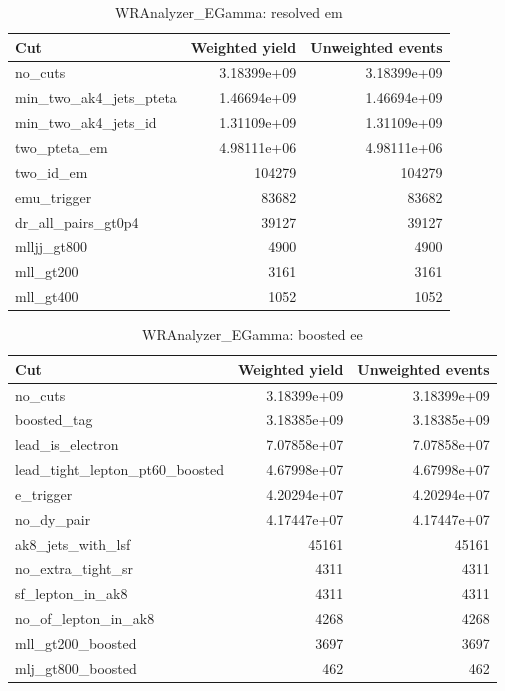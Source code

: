\documentclass{article}
\begin{document}
\begin{table}[htbp]
\centering
\caption{WRAnalyzer\_EGamma: resolved em}
\begin{tabular}{lrr}
\hline
Cut & Weighted yield & Unweighted events \\
\hline
no\_cuts & 3.18399e+09 & 3.18399e+09 \\
min\_two\_ak4\_jets\_pteta & 1.46694e+09 & 1.46694e+09 \\
min\_two\_ak4\_jets\_id & 1.31109e+09 & 1.31109e+09 \\
two\_pteta\_em & 4.98111e+06 & 4.98111e+06 \\
two\_id\_em & 104279 & 104279 \\
emu\_trigger & 83682 & 83682 \\
dr\_all\_pairs\_gt0p4 & 39127 & 39127 \\
mlljj\_gt800 & 4900 & 4900 \\
mll\_gt200 & 3161 & 3161 \\
mll\_gt400 & 1052 & 1052 \\
\hline
\end{tabular}
\end{table}

\begin{table}[htbp]
\centering
\caption{WRAnalyzer\_EGamma: boosted ee}
\begin{tabular}{lrr}
\hline
Cut & Weighted yield & Unweighted events \\
\hline
no\_cuts & 3.18399e+09 & 3.18399e+09 \\
boosted\_tag & 3.18385e+09 & 3.18385e+09 \\
lead\_is\_electron & 7.07858e+07 & 7.07858e+07 \\
lead\_tight\_lepton\_pt60\_boosted & 4.67998e+07 & 4.67998e+07 \\
e\_trigger & 4.20294e+07 & 4.20294e+07 \\
no\_dy\_pair & 4.17447e+07 & 4.17447e+07 \\
ak8\_jets\_with\_lsf & 45161 & 45161 \\
no\_extra\_tight\_sr & 4311 & 4311 \\
sf\_lepton\_in\_ak8 & 4311 & 4311 \\
no\_of\_lepton\_in\_ak8 & 4268 & 4268 \\
mll\_gt200\_boosted & 3697 & 3697 \\
mlj\_gt800\_boosted & 462 & 462 \\
\hline
\end{tabular}
\end{table}
\end{document}

